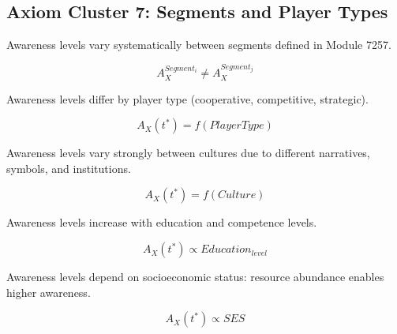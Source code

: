\subsection{Axiom Cluster 7: Segments and Player Types}
\label{subsec:axioms-segments}

\begin{axiom}
\label{ax:awx-a71}
Awareness levels vary systematically between segments defined in Module 7257.
\end{axiom}

\begin{equation}
A_X^{Segment_i} \neq A_X^{Segment_j}
\end{equation}

\begin{axiom}
\label{ax:awx-a72}
Awareness levels differ by player type (cooperative, competitive, strategic).
\end{axiom}

\begin{equation}
A_X(t^*) = f(PlayerType)
\end{equation}

\begin{axiom}
\label{ax:awx-a73}
Awareness levels vary strongly between cultures due to different narratives, 
symbols, and institutions.
\end{axiom}

\begin{equation}
A_X(t^*) = f(Culture)
\end{equation}

\begin{axiom}
\label{ax:awx-a74}
Awareness levels increase with education and competence levels.
\end{axiom}

\begin{equation}
A_X(t^*) \propto Education_{level}
\end{equation}

\begin{axiom}
\label{ax:awx-a75}
Awareness levels depend on socioeconomic status: resource abundance 
enables higher awareness.
\end{axiom}

\begin{equation}
A_X(t^*) \propto SES
\end{equation}

